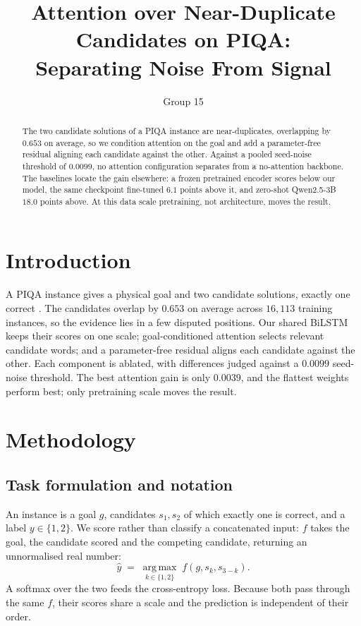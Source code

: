 \documentclass[11pt]{article}
\title{Attention over Near-Duplicate Candidates on PIQA:\\Separating Noise From Signal}
\author{Group 15}
\date{}
\begin{document}
\maketitle
\begin{abstract}
\noindent
The two candidate solutions of a PIQA instance are near-duplicates,
overlapping by $0.653$ on average, so we condition attention on the goal and
add a parameter-free residual aligning each candidate against the other.
Against a pooled seed-noise threshold of $0.0099$, no attention
configuration separates from a no-attention backbone. The baselines locate
the gain elsewhere: a frozen pretrained encoder scores below our model, the
same checkpoint fine-tuned $6.1$ points above it, and zero-shot Qwen2.5-3B
$18.0$ points above. At this data scale pretraining, not architecture, moves
the result.
\end{abstract}

\section{Introduction}
\label{sec:intro}

A PIQA instance gives a physical goal and two candidate solutions, exactly one
correct \citep{bisk2020piqa}. The candidates overlap by $0.653$ on average
across $16{,}113$ training instances, so the evidence lies in a few disputed
positions. Our shared BiLSTM keeps their scores on one scale; goal-conditioned
attention selects relevant candidate words; and a parameter-free residual
aligns each candidate against the other. Each component is ablated, with
differences judged against a $0.0099$ seed-noise threshold. The best attention
gain is only $0.0039$, and the flattest weights perform best; only pretraining
scale moves the result.

\section{Methodology}
\label{sec:method}

\subsection{Task formulation and notation}
\label{sec:task}

An instance is a goal $g$, candidates $s_1,s_2$ of which exactly one is
correct, and a label $y \in \{1,2\}$. We score rather than classify a
concatenated input: $f$ takes the goal, the candidate scored and the competing
candidate, returning an unnormalised real number:
\begin{equation}
\hat{y} \;=\; \operatorname*{arg\,max}_{k \in \{1,2\}} \; f(g,s_k,s_{3-k}).
\label{eq:argmax}
\end{equation}
A softmax over the two feeds the cross-entropy loss. Because both pass through
the same $f$, their scores share a scale and the prediction is independent of
their order.
\end{document}
